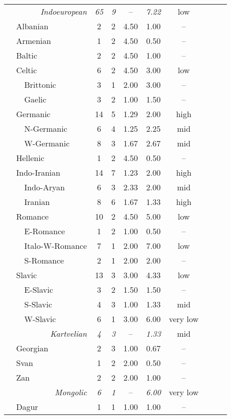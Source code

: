 \begin{footnotesize}
\begin{longtable}[h]{l l l || c || c | c | c || c c c | c}
\multicolumn{3}{r||}{\textit{Indoeuropean}}&\textit{65}&\textit{9}&–&\textit{7.22}	&low\\
&\multicolumn{2}{l||}{Albanian}		&2		&2		&4.50	&1.00	&–\\
&\multicolumn{2}{l||}{Armenian}		&1		&2		&4.50	&0.50	&–\\
&\multicolumn{2}{l||}{Baltic}		&2		&2		&4.50	&1.00	&–\\
&\multicolumn{2}{l||}{Celtic}		&6		&2		&4.50	&3.00	&low\\
&&Brittonic					&3 		&1		&2.00	&3.00	&–\\
&&Gaelic						&3 		&2		&1.00	&1.50	&–\\
&\multicolumn{2}{l||}{Germanic}		&14		&5		&1.29	&2.00	&high\\
&&N-Germanic					&6		&4		&1.25	&2.25	&mid\\
&&W-Germanic 				&8		&3		&1.67	&2.67	&mid\\
&\multicolumn{2}{l||}{Hellenic}		&1		&2		&4.50	&0.50	&–\\
&\multicolumn{2}{l||}{Indo-Iranian}	&14		&7		&1.23	&2.00	&high\\		
&&Indo-Aryan					&6		&3		&2.33	&2.00	&mid\\
&&Iranian						&8		&6		&1.67	&1.33	&high\\
&\multicolumn{2}{l||}{Romance}		&10		&2		&4.50	&5.00	&low\\
&&E-Romance					&1		&2		&1.00	&0.50	&–\\
&&Italo-W-Romance				&7		&1		&2.00	&7.00	&low\\
&&S-Romance					&2		&1		&2.00	&2.00	&–\\	
&\multicolumn{2}{l||}{Sla\-vic}		&13		&3		&3.00	&4.33	&low\\
&&E-Sla\-vic					&3		&2		&1.50	&1.50	&–\\
&&S-Sla\-vic					&4		&3		&1.00	&1.33	&mid\\
&&W-Sla\-vic					&6		&1		&3.00	&6.00	&very low\\
\hline
\multicolumn{3}{r||}{\textit{Kartvelian}}&\textit{4}	&\textit{3}	&–	&\textit{1.33}	&mid\\
&\multicolumn{2}{l||}{Georgian}		&2		&3		&1.00	&0.67	&–\\
&\multicolumn{2}{l||}{Svan}		&1		&2		&2.00	&0.50	&–\\
&\multicolumn{2}{l||}{Zan}			&2		&2		&2.00	&1.00	&–\\
\hline
\multicolumn{3}{r||}{\textit{Mongolic}}&\textit{6}&\textit{1}&–&\textit{6.00}		&very low\\
&\multicolumn{2}{l||}{Dagur}		&1		&1		&1.00	&1.00	&–\\

\end{longtable}
\end{footnotesize}
